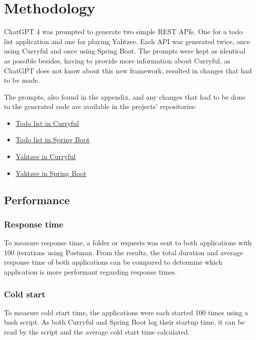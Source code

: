 \documentclass[a4paper]{article}
\begin{document}
\section{Methodology}
ChatGPT 4 was prompted to generate two simple REST APIs. One for a todo list
application and one for playing Yahtzee. Each API was generated twice, once
using Curryful and once using Spring Boot. The prompts were kept as identical as
possible besides, having to provide more information about Curryful, as ChatGPT
does not know about this new framework, resulted in changes that had to be made.

The prompts, also found in the appendix, and any changes that had to
be done to the generated code are available in the projects' repositories:
\begin{itemize}
	\item \hyperlink{https://github.com/lerchl/curryful-bachelor-thesis-curryful-todo-list}{Todo list in Curryful}
	\item \hyperlink{https://github.com/lerchl/curryful-bachelor-thesis-spring-boot-todo-list}{Todo list in Spring Boot}
	\item \hyperlink{https://github.com/lerchl/curryful-bachelor-thesis-curryful-yahtzee}{Yahtzee in Curryful}
	\item \hyperlink{https://github.com/lerchl/curryful-bachelor-thesis-spring-boot-yahtzee}{Yahtzee in Spring Boot}
\end{itemize}

\subsection{Performance}
\subsubsection{Response time}
To measure response time, a folder or requests was sent to both applications
with 100 iterations using Postman. From the results, the total duration and
average response time of both applications can be compared to determine which
application is more performant regarding response times.

\subsubsection{Cold start}
To measure cold start time, the applications were each started 100 times using
a bash script. As both Curryful and Spring Boot log their startup time, it can
be read by the script and the average cold start time calculated.
\end{document}
